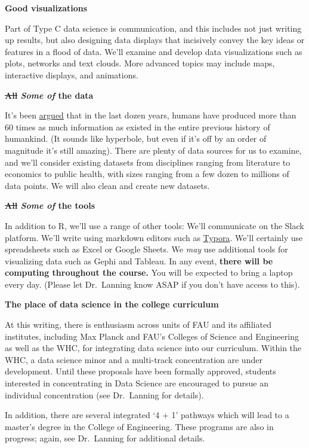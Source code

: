 \documentclass[
  openany]{book}
\begin{document}
\textbf{Good visualizations}

Part of Type C data science is communication, and this includes not just writing up results, but also designing data displays that incisively convey the key ideas or features in a flood of data. We'll examine and develop data visualizations such as plots, networks and text clouds. More advanced topics may include maps, interactive displays, and animations.

\textbf{\sout{All} \emph{Some of} the data}

It's been \href{https://www.udemy.com/datascience/learn/v4/t/lecture/3473822?start=379}{argued} that in the last dozen years, humans have produced more than 60 times as much information as existed in the entire previous history of humankind. (It sounds like hyperbole, but even if it's off by an order of magnitude it's still amazing). There are plenty of data sources for us to examine, and we'll consider existing datasets from disciplines ranging from literature to economics to public health, with sizes ranging from a few dozen to millions of data points. We will also clean and create new datasets.

\textbf{\sout{All} \emph{Some of} the tools}

In addition to R, we'll use a range of other tools: We'll communicate on the Slack platform. We'll write using markdown editors such as \href{https://typora.io/}{Typora}. We'll certainly use spreadsheets such as Excel or Google Sheets. We \emph{may} use additional tools for visualizing data such as Gephi and Tableau. In any event, \textbf{there will be computing throughout the course.} You will be expected to bring a laptop every day. (Please let Dr.~Lanning know ASAP if you don't have access to this).

\textbf{The place of data science in the college curriculum}

At this writing, there is enthusiasm across units of FAU and its affiliated institutes, including Max Planck and FAU's Colleges of Science and Engineering as well as the WHC, for integrating data science into our curriculum. Within the WHC, a data science minor and a multi-track concentration are under development. Until these proposals have been formally approved, students interested in concentrating in Data Science are encouraged to pursue an individual concentration (see Dr.~Lanning for details).

In addition, there are several integrated `4 + 1' pathways which will lead to a master's degree in the College of Engineering. These programs are also in progress; again, see Dr.~Lanning for additional details.
\end{document}
